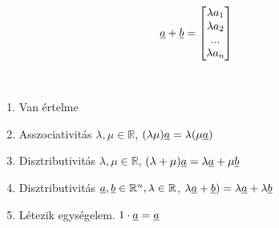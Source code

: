   \begin{frame}
  
    \begin{tcolorbox}[title={Def.: Szorzás számmal}]	
		\begin{align}
			\underline{a} + \underline{b} &= \begin{bmatrix}
				{\lambda}a_1 \\
				{\lambda}a_2 \\
				... \\
				{\lambda}a_n
			\end{bmatrix}
		\end{align}
		
		\tcblower
		
		 \\		
		
		 \msmallskip
		 
		 \begin{enumerate}
		 	\item Van értelme
		 	\item Asszociativitás ${\lambda}, {\mu} \in \mathbb{R}$, $({\lambda}{\mu})\underline{a} = {\lambda}({\mu}\underline{a})$
		 	\item Disztributivitás ${\lambda}, {\mu} \in \mathbb{R}$, $({\lambda} + {\mu})\underline{a} = {\lambda}\underline{a} + {\mu}\underline{b}$
		 	\item Disztributivitás $\underline{a}, \underline{b} \in \mathbb{R}^n, {\lambda} \in \mathbb{R}$, ${\lambda}\underline{a} + \underline{b}) = {\lambda}\underline{a} + {\lambda}\underline{b}$
		 	\item Létezik egységelem. $1 \cdot \underline{a} = \underline{a}$
		 \end{enumerate}
		
	\end{tcolorbox}
  	
    \end{frame}
  
